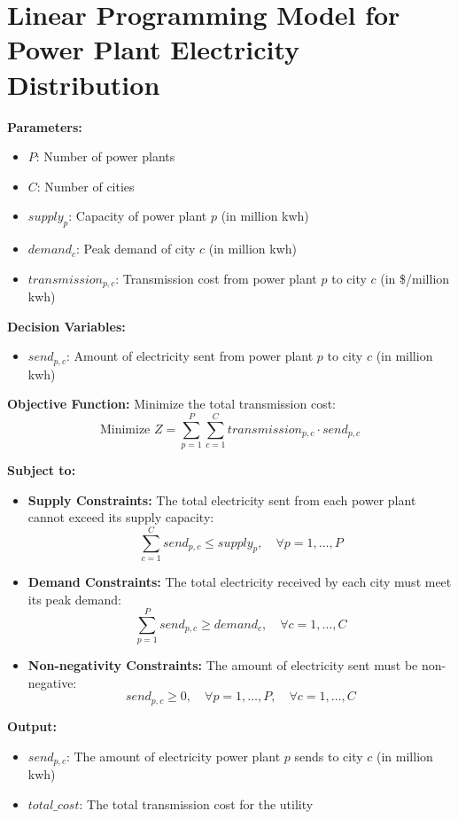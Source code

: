 \documentclass{article}
\begin{document}
\section*{Linear Programming Model for Power Plant Electricity Distribution}

\textbf{Parameters:}
\begin{itemize}
    \item $P$: Number of power plants
    \item $C$: Number of cities
    \item $supply_{p}$: Capacity of power plant $p$ (in million kwh)
    \item $demand_{c}$: Peak demand of city $c$ (in million kwh)
    \item $transmission_{p,c}$: Transmission cost from power plant $p$ to city $c$ (in \$/million kwh)
\end{itemize}

\textbf{Decision Variables:}
\begin{itemize}
    \item $send_{p,c}$: Amount of electricity sent from power plant $p$ to city $c$ (in million kwh)
\end{itemize}

\textbf{Objective Function:}
Minimize the total transmission cost:
\[
\text{Minimize } Z = \sum_{p=1}^{P} \sum_{c=1}^{C} transmission_{p,c} \cdot send_{p,c}
\]

\textbf{Subject to:}
\begin{itemize}
    \item \textbf{Supply Constraints:} The total electricity sent from each power plant cannot exceed its supply capacity:
    \[
    \sum_{c=1}^{C} send_{p,c} \leq supply_{p}, \quad \forall p = 1, \ldots, P
    \]
    
    \item \textbf{Demand Constraints:} The total electricity received by each city must meet its peak demand:
    \[
    \sum_{p=1}^{P} send_{p,c} \geq demand_{c}, \quad \forall c = 1, \ldots, C
    \]
    
    \item \textbf{Non-negativity Constraints:} The amount of electricity sent must be non-negative:
    \[
    send_{p,c} \geq 0, \quad \forall p = 1, \ldots, P, \quad \forall c = 1, \ldots, C
    \]
\end{itemize}

\textbf{Output:}
\begin{itemize}
    \item $send_{p,c}$: The amount of electricity power plant $p$ sends to city $c$ (in million kwh)
    \item $total\_cost$: The total transmission cost for the utility
\end{itemize}
\end{document}
